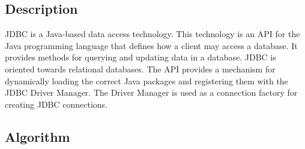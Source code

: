 \subsection{Description}
JDBC is a Java-based data access technology. This technology is an API for the Java programming language that defines how a client may access a database. It provides methods for querying and updating data in a database. JDBC is oriented towards relational databases. The API provides a mechanism for dynamically loading the correct Java packages and registering them with the JDBC Driver Manager. The Driver Manager is used as a connection factory for creating JDBC connections.
\subsection{Algorithm}
